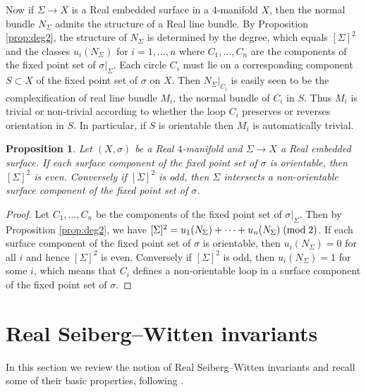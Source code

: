 \documentclass{amsart}
\newtheorem{proposition}[theorem]{Proposition}
\theoremstyle{definition}
\theoremstyle{remark}
\numberwithin{equation}{section}
\begin{document}
Now if $\Sigma \to X$ is a Real embedded surface in a $4$-manifold $X$, then the normal bundle $N_\Sigma$ admits the structure of a Real line bundle. By Proposition \ref{prop:deg2}, the structure of $N_\Sigma$ is determined by the degree, which equals $[\Sigma]^2$ and the classes $u_i( N_\Sigma)$ for $i=1, \dots ,n$ where $C_1, \dots , C_n$ are the components of the fixed point set of $\sigma|_\Sigma$. Each circle $C_i$ must lie on a corresponding component $S \subset X$ of the fixed point set of $\sigma$ on $X$. Then $N_\Sigma|_{C_i}$ is easily seen to be the complexification of real line bundle $M_i$, the normal bundle of $C_i$ in $S$. Thus $M_i$ is trivial or non-trivial according to whether the loop $C_i$ preserves or reverses orientation in $S$. In particular, if $S$ is orientable then $M_i$ is automatically trivial.

\begin{proposition}\label{prop:n2}
Let $(X,\sigma)$ be a Real $4$-manifold and $\Sigma \to X$ a Real embedded surface. If each surface component of the fixed point set of $\sigma$ is orientable, then $[\Sigma]^2$ is even. Conversely if $[\Sigma]^2$ is odd, then $\Sigma$ intersects a non-orientable surface component of the fixed point set of $\sigma$.
\end{proposition}
\begin{proof}
Let $C_1, \dots , C_n$ be the components of the fixed point set of $\sigma|_{\Sigma}$. Then by Proposition \ref{prop:deg2}, we have $[\Sigma]^2 = u_1(N_\Sigma) + \cdots + u_n(N_\Sigma) \; ({\rm mod} \; 2)$. If each surface component of the fixed point set of $\sigma$ is orientable, then $u_i(N_\Sigma) = 0$ for all $i$ and hence $[\Sigma]^2$ is even. Conversely if $[\Sigma]^2$ is odd, then $u_i(N_\Sigma) = 1$ for some $i$, which means that $C_i$ defines a non-orientable loop in a surface component of the fixed point set of $\sigma$.
\end{proof}



\section{Real Seiberg--Witten invariants}\label{sec:rsw}

In this section we review the notion of Real Seiberg--Witten invariants and recall some of their basic properties, following \cite{tw,bar3}.
\end{document}
